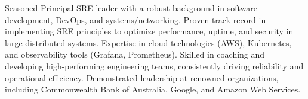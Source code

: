 

\begin{cvparagraph}
  Seasoned Principal SRE leader with a robust background in software development, DevOps, and systems/networking. Proven track record in implementing SRE principles to optimize performance, uptime, and security in large distributed systems. Expertise in cloud technologies (AWS), Kubernetes, and observability tools (Grafana, Prometheus). Skilled in coaching and developing high-performing engineering teams, consistently driving reliability and operational efficiency. Demonstrated leadership at renowned organizations, including Commonwealth Bank of Australia, Google, and Amazon Web Services.
\end{cvparagraph}
